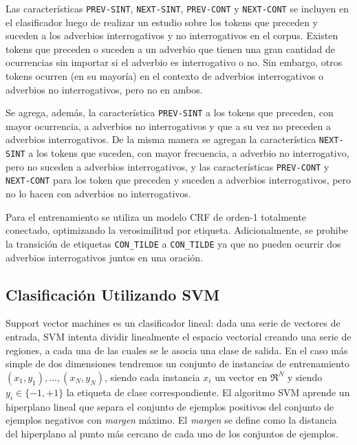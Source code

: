 \documentclass[runningheads,a4paper]{llncs}
\begin{document}
Las características \texttt{\small PREV-SINT}, \texttt{\small NEXT-SINT}, \texttt{\small PREV-CONT} y \texttt{\small NEXT-CONT} se incluyen en el clasificador luego de realizar un estudio sobre los tokens que preceden y  suceden a los adverbios interrogativos y no interrogativos en el corpus. Existen tokens que preceden o suceden a un adverbio que tienen una gran cantidad de ocurrencias sin importar si el adverbio es interrogativo o no. Sin embargo, otros tokens ocurren (en su mayoría) en el contexto de adverbios interrogativos o adverbios no interrogativos, pero no en ambos.

Se agrega, además, la característica \texttt{\small PREV-SINT} a los tokens que preceden, con mayor ocurrencia, a adverbios no interrogativos y que a su vez no preceden a adverbios interrogativos. De la misma manera se agregan la característica \texttt{\small NEXT-SINT} a los tokens que suceden, con mayor frecuencia, a adverbio no interrogativo, pero no suceden a adverbios interrogativos, y  las características \texttt{\small PREV-CONT} y \texttt{\small NEXT-CONT} para los token que preceden y suceden a adverbios interrogativos, pero no lo hacen con adverbios no interrogativos.

Para el entrenamiento se utiliza un modelo CRF de orden-1 totalmente conectado, optimizando la verosimilitud por etiqueta. Adicionalmente, se prohibe la transición de etiquetas \texttt{\small CON\_TILDE} a \texttt{\small CON\_TILDE} ya que no pueden ocurrir dos adverbios interrogativos juntos en una oración. 

\subsection{Clasificación Utilizando SVM}
\label{sec:SVM}

Support vector machines\cite{JOACHIMS99} es un clasificador lineal: dada una serie de vectores de entrada, SVM intenta dividir linealmente el espacio vectorial creando una serie de regiones, a cada una de las cuales se le asocia una clase de salida. En el caso más simple de dos dimensiones tendremos un conjunto de instancias de entrenamiento ${(x_1, y_1),...,(x_N,y_N)}$, siendo cada instancia $x_i$ un vector en $\Re^N$ y siendo $y_i \in \lbrace-1,+1\rbrace$ la etiqueta de clase correspondiente. El algoritmo SVM aprende un hiperplano lineal que separa el conjunto de ejemplos positivos del conjunto de ejemplos negativos con \emph{margen} máximo. El \emph{margen} se define como la distancia del hiperplano al punto más cercano de cada uno de los conjuntos de ejemplos.
\end{document}
